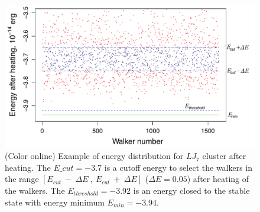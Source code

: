 \documentclass[preprint,12pt]{elsarticle}
\begin{document}





\begin{figure}[!t]
 \begin{center}
 \includegraphics[scale=0.75]{Ecut.pdf}
  \caption{(Color online) Example of energy distribution for $LJ_7$ cluster after heating. 
  The $E\_cut=-3.7$ is a cutoff energy to select the walkers in the range $[E_{cut}~-~\Delta E~,~E_{cut}~+~\Delta E]$ ($\Delta E = 0.05$) after heating of the walkers. 
The $E_{threshold}=-3.92$ is an energy closed to the stable state with energy minimum $E_{min}=-3.94$.}
  \label{fig:Ecut}
 \end{center}
\end{figure}
\end{document}
